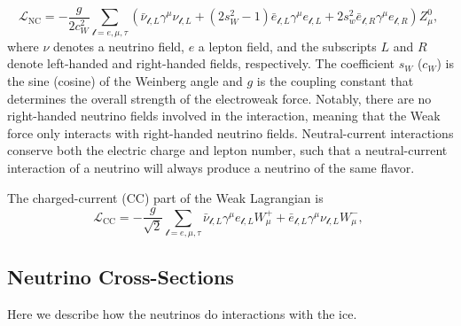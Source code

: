 \begin{equation}
    \mathcal{L}_\mathrm{NC} = -\frac{g}{2 c_W^2} \sum_{\mathcal{l}=e,\mu,\tau} (\bar{\nu}_{\mathcal{l}, L} \gamma^\mu \nu_{\mathcal{l}, L} + (2 s_W^2 - 1) \bar{e}_{\mathcal{l}, L} \gamma^\mu e_{\mathcal{l}, L} + 2s_w^2 \bar{e}_{\mathcal{l}, R} \gamma^\mu e_{\mathcal{l}, R}) Z^0_\mu,\; \label{eq:ew-nc-lagrangian}
\end{equation}
where $\nu$ denotes a neutrino field, $e$ a lepton field, and the subscripts $L$ and $R$ denote left-handed and right-handed fields, respectively. The coefficient $s_W$ ($c_W$) is the sine (cosine) of the Weinberg angle and $g$ is the coupling constant that determines the overall strength of the electroweak force. Notably, there are no right-handed neutrino fields involved in the interaction, meaning that the Weak force only interacts with right-handed neutrino fields. Neutral-current interactions conserve both the electric charge and lepton number, such that a neutral-current interaction of a neutrino will always produce a neutrino of the same flavor. 

The charged-current (CC) part of the Weak Lagrangian is 
\begin{equation}
    \mathcal{L}_\mathrm{CC} = -\frac{g}{\sqrt{2}} \sum_{\mathcal{l}=e,\mu,\tau} \bar{\nu}_{\mathcal{l},L} \gamma^\mu e_{\mathcal{l},L} W^+_\mu + \bar{e}_{\mathcal{l},L} \gamma^\mu \nu_{\mathcal{l},L} W^-_\mu,\; \label{eq:ew-cc-lagrangian}
\end{equation}
\subsection{Neutrino Cross-Sections}
\label{sec:neutrino-xsec}

Here we describe how the neutrinos do interactions with the ice.